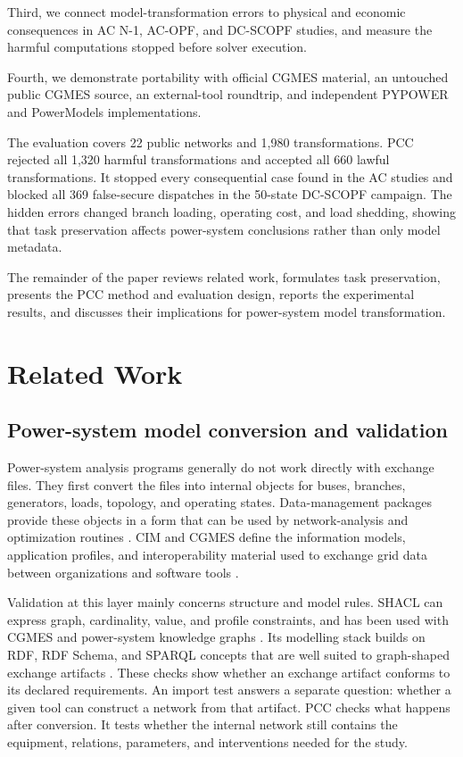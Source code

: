 \documentclass[preprint,12pt]{elsarticle}
\begin{document}
Third, we connect model-transformation errors to physical and economic consequences in AC N-1, AC-OPF, and DC-SCOPF studies, and measure the harmful computations stopped before solver execution.

Fourth, we demonstrate portability with official CGMES material, an untouched public CGMES source, an external-tool roundtrip, and independent PYPOWER and PowerModels implementations.

The evaluation covers 22 public networks and 1,980 transformations. PCC rejected all 1,320 harmful transformations and accepted all 660 lawful transformations. It stopped every consequential case found in the AC studies and blocked all 369 false-secure dispatches in the 50-state DC-SCOPF campaign. The hidden errors changed branch loading, operating cost, and load shedding, showing that task preservation affects power-system conclusions rather than only model metadata.

The remainder of the paper reviews related work, formulates task preservation, presents the PCC method and evaluation design, reports the experimental results, and discusses their implications for power-system model transformation.

\section{Related Work}
\subsection{Power-system model conversion and validation}

Power-system analysis programs generally do not work directly with exchange files. They first convert the files into internal objects for buses, branches, generators, loads, topology, and operating states. Data-management packages provide these objects in a form that can be used by network-analysis and optimization routines \citep{lara2021powersystems}. CIM and CGMES define the information models, application profiles, and interoperability material used to exchange grid data between organizations and software tools \citep{cgmes30,entsoe_apl111,cim_grid_models_exchange,cim_standards_page}.

Validation at this layer mainly concerns structure and model rules. SHACL can express graph, cardinality, value, and profile constraints, and has been used with CGMES and power-system knowledge graphs \citep{larhrib2020shacl,larhrib2024smartgrids,li2022shacl,shacl2017,shacl_af2017,shacl12core2026,shacl12sparql2026}. Its modelling stack builds on RDF, RDF Schema, and SPARQL concepts that are well suited to graph-shaped exchange artifacts \citep{rdf11concepts2014,rdf_schema,sparql11query2013,sparql11_overview}. These checks show whether an exchange artifact conforms to its declared requirements. An import test answers a separate question: whether a given tool can construct a network from that artifact. PCC checks what happens after conversion. It tests whether the internal network still contains the equipment, relations, parameters, and interventions needed for the study.
\end{document}
